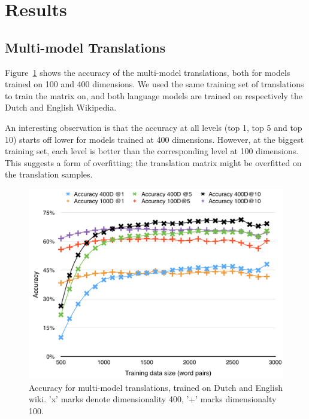 \section{Results}
\label{sec:results}


\subsection{Multi-model Translations}
Figure~\ref{fig:accuracy_multi_model_wikis} shows the accuracy of the multi-model translations, both for models trained on 100 and 400 dimensions. We used the same training set of translations to train the matrix on, and both language models are trained on respectively the Dutch and English Wikipedia.

An interesting observation is that the accuracy at all levels (top 1, top 5 and top 10) starts off lower for models trained at 400 dimensions. However, at the biggest training set, each level is better than the corresponding level at 100 dimensions. This suggests a form of overfitting; the translation matrix might be overfitted on the translation samples.


\begin{figure}[ht!]
  \centering \includegraphics[width=\linewidth]{images/accuracy_multi_model_wikis}
  \caption{Accuracy for multi-model translations, trained on Dutch and English wiki. 'x' marks denote dimensionality 400, '+' marks dimensionalty 100.}
  \label{fig:accuracy_multi_model_wikis}
\end{figure}

